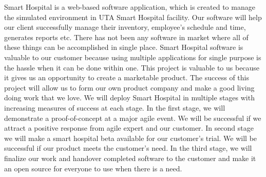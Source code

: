
Smart Hospital is a web-based software application, which is created to manage the simulated environment in UTA Smart Hospital facility. Our software will help our client successfully manage their inventory, employee's schedule and time, generates reports etc. There has not been any software in market where all of these things can be accomplished in single place. Smart Hospital software is valuable to our customer because using multiple applications for single purpose is the hassle when it can be done within one. This project is valuable to us because it gives us an opportunity to create a marketable product. The success of this project will allow us to form our own product company and make a good living doing work that we love. We will deploy Smart Hospital in multiple stages with increasing measures of success at each stage. In the first stage, we will demonstrate a proof-of-concept at a major agile event. We will be successful if we attract a positive response from agile expert and our customer. In second stage we will make a smart hospital beta available for our customer’s trial. We will be successful if our product meets the customer’s need. In the third stage, we will finalize our work and handover completed software to the customer and make it an open source for everyone to use when there is a need.
